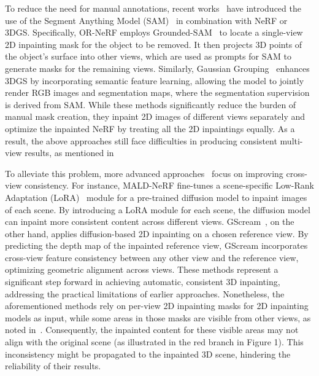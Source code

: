 To reduce the need for manual annotations, recent works~\cite{yin2023ornerf, ye2023gaussiangrouping} have introduced the use of the Segment Anything Model (SAM)~\cite{kirillov2023sam} in combination with NeRF or 3DGS. Specifically, OR-NeRF employs Grounded-SAM~\cite{ren2024grounded} to locate a single-view 2D inpainting mask for the object to be removed. It then projects 3D points of the object's surface into other views, which are used as prompts for SAM to generate masks for the remaining views. 
Similarly, Gaussian Grouping~\cite{ye2023gaussiangrouping} enhances 3DGS by incorporating semantic feature learning, allowing the model to jointly render RGB images and segmentation maps, where the segmentation supervision is derived from SAM. 
While these methods significantly reduce the burden of manual mask creation, they inpaint 2D images of different views separately and optimize the inpainted NeRF by treating all the 2D inpaintings equally. As a result, the above approaches still face difficulties in producing consistent multi-view results, as mentioned in~\cite{lin2024maldnerf, chen2024mvip, wang2024gscream}



To alleviate this problem, more advanced approaches~\cite{chen2024mvip, lin2024maldnerf, wang2024gscream} focus on improving cross-view consistency. For instance, MALD-NeRF fine-tunes a scene-specific Low-Rank Adaptation (LoRA)~\cite{hu2021lora} module for a pre-trained diffusion model to inpaint images of each scene. By introducing a LoRA module for each scene, the diffusion model can inpaint more consistent content across different views. GScream~\cite{wang2024gscream}, on the other hand, applies diffusion-based 2D inpainting on a chosen reference view. By predicting the depth map of the inpainted reference view, GScream incorporates cross-view feature consistency between any other view and the reference view, optimizing geometric alignment across views. These methods represent a significant step forward in achieving automatic, consistent 3D inpainting, addressing the practical limitations of earlier approaches. Nonetheless, the aforementioned methods rely on per-view 2D inpainting masks for 2D inpainting models as input, while some areas in those masks are visible from other views, as noted in~\cite{ye2023gaussiangrouping}. Consequently, the inpainted content for these visible areas may not align with the original scene (as illustrated in the red branch in Figure 1). This inconsistency might be propagated to the inpainted 3D scene, hindering the reliability of their results.
